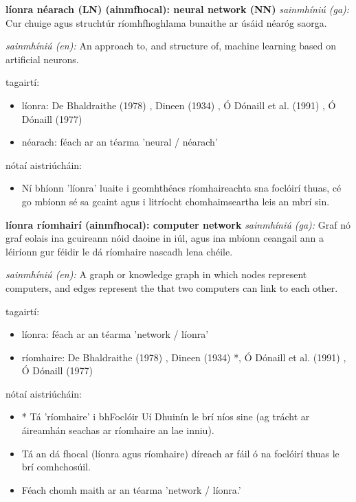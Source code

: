 \documentclass{article}
\begin{document}
\textbf{líonra néarach (LN) (ainmfhocal): neural network (NN)}
\textit{sainmhíniú (ga):} Cur chuige agus struchtúr ríomhfhoghlama bunaithe ar úsáid néaróg saorga.

\textit{sainmhíniú (en):} An approach to, and structure of, machine learning based on artificial neurons.

tagairtí:
\begin{itemize}
	\item líonra: De Bhaldraithe (1978) \cite{de-bhaldraithe}, Dineen (1934) \cite{dineen}, Ó Dónaill et al. (1991) \cite{focloir-beag}, Ó Dónaill (1977) \cite{odonaill}
	\item néarach: féach ar an téarma 'neural / néarach'
\end{itemize}

nótaí aistriúcháin:
\begin{itemize}
	\item Ní bhíonn 'líonra' luaite i gcomhthéacs ríomhaireachta sna foclóirí thuas, cé go mbíonn sé sa gcaint agus i litríocht chomhaimseartha leis an mbrí sin.
\end{itemize}


\textbf{líonra ríomhairí (ainmfhocal): computer network}
\textit{sainmhíniú (ga):} Graf nó graf eolais ina gcuireann nóid daoine in iúl, agus ina mbíonn ceangail ann a léiríonn gur féidir le dá ríomhaire nascadh lena chéile.

\textit{sainmhíniú (en):} A graph or knowledge graph in which nodes represent computers, and edges represent the that two computers can link to each other.

tagairtí:
\begin{itemize}
	\item líonra: féach ar an téarma 'network / líonra'
	\item ríomhaire: De Bhaldraithe (1978) \cite{de-bhaldraithe}, Dineen (1934) \cite{dineen}*, Ó Dónaill et al. (1991) \cite{focloir-beag}, Ó Dónaill (1977) \cite{odonaill}
\end{itemize}

nótaí aistriúcháin:
\begin{itemize}
	\item * Tá 'ríomhaire' i bhFoclóir Uí Dhuinín le brí níos sine (ag trácht ar áireamhán seachas ar ríomhaire an lae inniu).
	\item Tá an dá fhocal (líonra agus ríomhaire) díreach ar fáil ó na foclóirí thuas le brí comhchosúil.
	\item Féach chomh maith ar an téarma 'network / líonra.'
\end{itemize}
\end{document}
